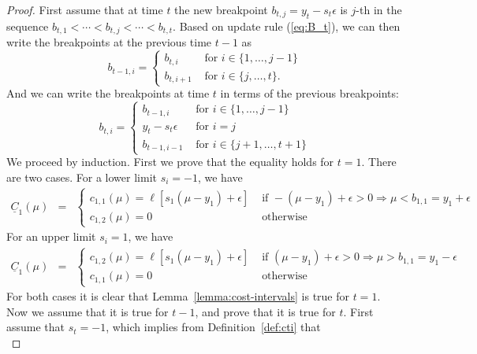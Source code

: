 \documentclass{article}
\begin{document}
\begin{proof}
  First assume that at time $t$ the new breakpoint
  $b_{t,j}=y_t-s_t\epsilon$ is $j$-th in the sequence
  $b_{t,1}<\cdots<b_{t,j}<\cdots<b_{t,t}$. Based on update rule
  (\ref{eq:B_t}), we can then write the breakpoints at the previous time
  $t-1$ as
  \begin{equation}
    b_{t-1,i} =
  \begin{cases}
    b_{t,i} & \text{ for } i\in\{1,\dots,j-1\} \\
    b_{t,i+1}&\text{ for } i\in\{j,\dots,t\}.
  \end{cases}
  \end{equation}
  And we can write the breakpoints at time $t$ in terms of the previous breakpoints:
  \begin{equation}
      b_{t,i} =
  \begin{cases}
    b_{t-1,i}&\text{ for }i\in\{1,\dots,j-1\} \\
    y_t-s_t\epsilon&\text{ for }i=j\\
    b_{t-1,i-1}&\text{ for }i\in\{j+1,\dots,t+1\}
  \end{cases}
  \label{eq:recursive-b}
  \end{equation}
  We proceed by induction. First we prove that the equality holds for
  $t=1$. There are two cases. For a lower limit $s_i=-1$, we have
  \begin{eqnarray}
\underline C_1(\mu)&=&
\begin{cases}
  c_{1,1}(\mu)=\ell[s_1(\mu-y_1)+\epsilon] &\text{ if }-(\mu-y_1)+\epsilon>0\Rightarrow\mu < b_{1,1}=y_1+\epsilon\\
  c_{1,2}(\mu)=0 & \text{ otherwise}
\end{cases}
  \end{eqnarray}
For an upper limit $s_i=1$, we have
  \begin{eqnarray}
\underline C_1(\mu)&=&
\begin{cases}
  c_{1,2}(\mu)=\ell[s_1(\mu-y_1)+\epsilon] &\text{ if }(\mu-y_1)+\epsilon>0\Rightarrow\mu > b_{1,1}=y_1-\epsilon\\
  c_{1,1}(\mu)=0 & \text{ otherwise}
\end{cases}
  \end{eqnarray}
  For both cases it is clear that Lemma~\ref{lemma:cost-intervals}
  is true for $t=1$. Now we assume that it is true for $t-1$, and
  prove that it is true for $t$. First assume that $s_t=-1$, which
  implies from Definition~\ref{def:cti} that 
  \begin{equation}

\end{equation}
\end{proof}
\end{document}
